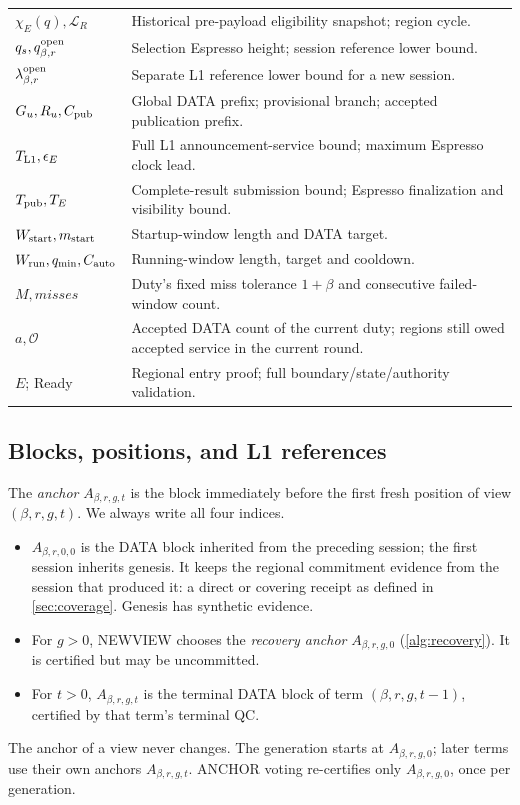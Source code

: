 \documentclass[11pt,a4paper]{article}
\newcommand{\defterm}[1]{\textcolor{rrBlue}{\textit{#1}}}
\begin{document}
\begin{table}[htbp]
\begin{tabularx}{\linewidth}{@{}p{.32\linewidth}Y@{}}
$\chi_E(q),\mathcal L_R$ & Historical pre-payload eligibility snapshot; region cycle.\\
$q_s,q_{\beta,r}^{\rm open}$ & Selection Espresso height; session reference lower bound.\\
$\lambda_{\beta,r}^{\rm open}$ & Separate L1 reference lower bound for a new session.\\
$G_u,R_u,C_{\rm pub}$ & Global DATA prefix; provisional branch; accepted publication prefix.\\
$T_{\rm L1},\epsilon_E$ & Full L1 announcement-service bound; maximum Espresso clock lead.\\
$T_{\rm pub},T_E$ & Complete-result submission bound; Espresso finalization and visibility bound.\\
$W_{\rm start},m_{\rm start}$ & Startup-window length and DATA target.\\
$W_{\rm run},q_{\min},C_{\rm auto}$ & Running-window length, target and cooldown.\\
$M,\mathit{misses}$ & Duty's fixed miss tolerance $1+\beta$ and consecutive failed-window count.\\
$a,\mathcal O$ & Accepted DATA count of the current duty; regions still owed accepted service in the current round.\\
$E$; Ready & Regional entry proof; full boundary/state/authority validation.\\
\bottomrule\end{tabularx}
\end{table}

\subsection{Blocks, positions, and L1 references}
\label{sec:blocks}
The \defterm{anchor} $A_{\beta,r,g,t}$ is the block immediately before the first fresh
position of view $(\beta,r,g,t)$. We always write all four indices.
\begin{itemize}
\item $A_{\beta,r,0,0}$ is the DATA block inherited from the preceding
session; the first session inherits genesis. It keeps the regional commitment evidence from the session that
produced it: a direct or covering receipt as defined in
\cref{sec:coverage}. Genesis has synthetic evidence.
\item For $g>0$, NEWVIEW chooses the \defterm{recovery anchor} $A_{\beta,r,g,0}$
(\cref{alg:recovery}). It is certified but may be uncommitted.
\item For $t>0$, $A_{\beta,r,g,t}$ is the terminal DATA block of term
$(\beta,r,g,t-1)$, certified by that term's terminal QC.
\end{itemize}
The anchor of a view never changes. The generation starts at
$A_{\beta,r,g,0}$; later terms use their own anchors $A_{\beta,r,g,t}$. ANCHOR voting
re-certifies only $A_{\beta,r,g,0}$, once per generation.
\end{document}
